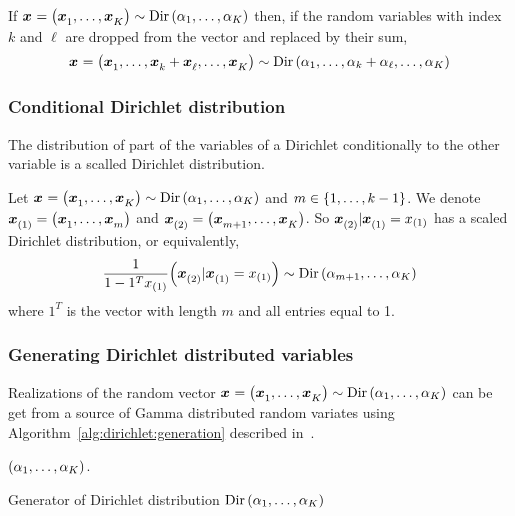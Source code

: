 \begin{prop}\label{prop:dirichlet:aggregation}
  If $\va x=\bracket{\va x_1,\ldots,\va x_K}\sim \Dir\bracket{\alpha_1,\ldots,\alpha_K}$ then, if the random variables with index $k$ and $\ell$ are dropped from the vector and replaced by their sum,
  $$\va x=\bracket{\va x_1,\ldots,\va x_k+\va x_{\ell},\ldots,\va x_K}\sim \Dir\bracket{\alpha_1,\ldots,\alpha_k+\alpha_{\ell},\ldots,\alpha_K}$$
\end{prop}


\subsubsection{Conditional Dirichlet distribution}


The distribution of part of the variables of a Dirichlet conditionally to the other variable is a scalled Dirichlet distribution.


\begin{prop}\label{prop:dirichlet:conditional}
  Let $\va x=\bracket{\va x_1,\ldots,\va x_K}\sim \Dir\bracket{\alpha_1,\ldots,\alpha_K}$ and $m\in\range[1]{k-1}$.
  We denote $\va x_{(1)}=\bracket{\va x_1,\ldots,\va x_m}$ and $\va x_{(2)}=\bracket{\va x_{m+1},\ldots,\va x_K}$.
  So $\va x_{(2)}|\va x_{(1)}=x_{(1)}$ has a scaled Dirichlet distribution, or equivalently,
  $$
  \frac{1}{1-1^T x_{(1)}} \bracket{\va x_{(2)}|\va x_{(1)}=x_{(1)}}
  \sim
  \Dir\bracket{\alpha_{m+1},\ldots,\alpha_K}
  $$
  where $1^T$ is the vector with length $m$ and all entries equal to 1.
\end{prop}


\subsubsection{Generating Dirichlet distributed variables}


Realizations of the random vector $\va x=\bracket{\va x_1,\ldots,\va x_K}\sim\Dir\bracket{\alpha_1,\ldots,\alpha_K}$ can be get from a source of Gamma distributed random variates using Algorithm~\ref{alg:dirichlet:generation} described in~\citet{Frigyik2010}.


\begin{algorithm}[H]


\BlankLine






\BlankLine


\Return $\bracket{\alpha_1,\ldots,\alpha_K}$.\;


\BlankLine
\caption{Generator of Dirichlet distribution $\Dir\bracket{\alpha_1,\ldots,\alpha_K}$}
\label{alg:dirichlet:generation}
\end{algorithm}


